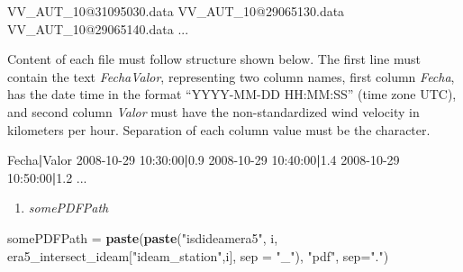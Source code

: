 \documentclass[12pt,oneside]{reedthesis}
\newenvironment{Shaded}{\begin{snugshade}}{\end{snugshade}}
\newcommand{\DataTypeTok}[1]{\textcolor[rgb]{0.13,0.29,0.53}{#1}}
\newcommand{\ExtensionTok}[1]{#1}
\newcommand{\KeywordTok}[1]{\textcolor[rgb]{0.13,0.29,0.53}{\textbf{#1}}}
\newcommand{\NormalTok}[1]{#1}
\newcommand{\StringTok}[1]{\textcolor[rgb]{0.31,0.60,0.02}{#1}}
\providecommand{\tightlist}{%
  \setlength{\itemsep}{0pt}\setlength{\parskip}{0pt}}
\begin{document}
\scriptsize

\vspace{0.4cm}
\begin{Shaded}
\begin{Highlighting}[]
      \ExtensionTok{VV_AUT_10@31095030.data}
      \ExtensionTok{VV_AUT_10@29065130.data}
      \ExtensionTok{VV_AUT_10@29065140.data}
      \ExtensionTok{...}
\end{Highlighting}
\end{Shaded}
\normalsize

Content of each file must follow structure shown below. The first line must contain the text \emph{Fecha\textbar Valor}, representing two column names, first column \emph{Fecha}, has the date time in the format ``YYYY-MM-DD HH:MM:SS'' (time zone UTC), and second column \emph{Valor} must have the non-standardized wind velocity in kilometers per hour. Separation of each column value must be the \emph{\textbar{}} character.

\scriptsize

\vspace{0.4cm}
\begin{Shaded}
\begin{Highlighting}[]
      \ExtensionTok{Fecha}\KeywordTok{|}\ExtensionTok{Valor}
      \ExtensionTok{2008-10-29}\NormalTok{ 10:30:00}\KeywordTok{|}\ExtensionTok{0.9}
      \ExtensionTok{2008-10-29}\NormalTok{ 10:40:00}\KeywordTok{|}\ExtensionTok{1.4}
      \ExtensionTok{2008-10-29}\NormalTok{ 10:50:00}\KeywordTok{|}\ExtensionTok{1.2}
      \ExtensionTok{...}
\end{Highlighting}
\end{Shaded}
\normalsize
\begin{enumerate}
\def\labelenumi{\arabic{enumi}.}
\setcounter{enumi}{5}
\tightlist
\item
  \emph{somePDFPath}
\end{enumerate}
\scriptsize

\vspace{0.4cm}
\begin{Shaded}
\begin{Highlighting}[]
\NormalTok{      somePDFPath =}\StringTok{ }\KeywordTok{paste}\NormalTok{(}\KeywordTok{paste}\NormalTok{(}\StringTok{"isdideamera5"}\NormalTok{, i, era5_intersect_ideam[}\StringTok{"ideam_station"}\NormalTok{,i], }\DataTypeTok{sep =} \StringTok{"_"}\NormalTok{), }
                          \StringTok{"pdf"}\NormalTok{, }\DataTypeTok{sep=}\StringTok{"."}\NormalTok{)}
\end{Highlighting}
\end{Shaded}
\normalsize
\end{document}
